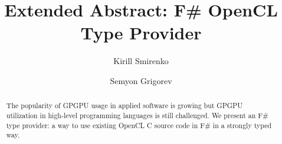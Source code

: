 \documentclass[sigplan,review]{acmart}\settopmatter{printfolios=true}
\begin{document}
\title[]{Extended Abstract: F\# OpenCL Type Provider}         %



\author{Kirill Smirenko}


\author{Semyon Grigorev}


\begin{abstract}
The popularity of GPGPU usage in applied software is growing but GPGPU utilization in high-level programming languages is still challenged.
We present an F\# type provider: a way to use existing OpenCL C source code in F\# in a strongly typed way. 
\end{abstract}
\end{document}
